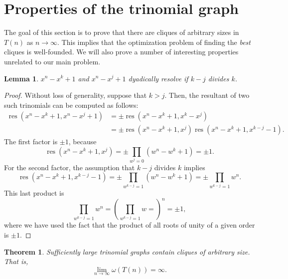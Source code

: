 \documentclass[]{article}
\newtheorem{lemma}{Lemma}[section]
\newtheorem{theorem}{Theorem}[section]
\theoremstyle{definition}
\DeclareMathOperator{\res}{res}
\newcommand{\tri}[3]{\ensuremath{#1^{#2} - #1^{#3} + 1}}
\begin{document}
\section{Properties of the trinomial graph}

The goal of this section is to prove that there are cliques of arbitrary sizes
in $T(n)$ as $n \to \infty$. This implies that the optimization problem of
finding the \emph{best} cliques is well-founded. We will also prove a number of
interesting properties unrelated to our main problem.

\begin{lemma}
    \label{simple-seq}
    \tri{x}{n}{k} and \tri{x}{n}{j} dyadically resolve if $k - j$ divides $k$.
\end{lemma}

\begin{proof}
    Without loss of generality, suppose that $k > j$. Then, the resultant of
    two such trinomials can be computed as follows:
    \begin{align*}
        \res(\tri{x}{n}{k}, \tri{x}{n}{j})
        &=
        \pm\res(\tri{x}{n}{k}, x^k - x^j) \\
        &=
        \pm\res(\tri{x}{n}{k}, x^j) \res(\tri{x}{n}{k}, x^{k - j} - 1).
    \end{align*}
    The first factor is $\pm 1$, because
    \begin{equation*}
        \res(\tri{x}{n}{k}, x^j) = \pm\prod_{w^j = 0} (\tri{w}{n}{k}) = \pm1.
    \end{equation*}
    For the second factor, the assumption that $k - j$ divides $k$ implies
    \begin{equation*}
        \res(\tri{x}{n}{k}, x^{k - j} - 1)
        =
        \pm \prod_{w^{k - j} = 1} (\tri{w}{n}{k})
        =
        \pm \prod_{w^{k - j} = 1} w^n.
    \end{equation*}
    This last product is
    \begin{equation*}
        \prod_{w^{k - j} = 1} w^n
        = \left( \prod_{w^{k - j} = 1} w =  \right)^n
        = \pm 1,
    \end{equation*}
    where we have used the fact that the product of all roots of unity of a
    given order is $\pm 1$.
\end{proof}

\begin{theorem}
    Sufficiently large trinomial graphs contain cliques of arbitrary size.
    That is,
    \begin{equation*}
        \lim_{n \to \infty} \omega(T(n)) = \infty.
    \end{equation*}
\end{theorem}
\end{document}
